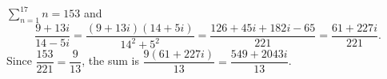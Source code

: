 $\displaystyle\sum_{n=1}^{17}n=153$ and
\[\dfrac{9+13i}{14-5i}=\dfrac{(9+13i)(14+5i)}{14^2+5^2}=\dfrac{126+45i+182i-65}{221}=\dfrac{61+227i}{221}.\]
Since $\dfrac{153}{221}=\dfrac9{13}$, the sum is $\dfrac{9(61+227i)}{13}=\boxed{\dfrac{549+2043i}{13}}$.

